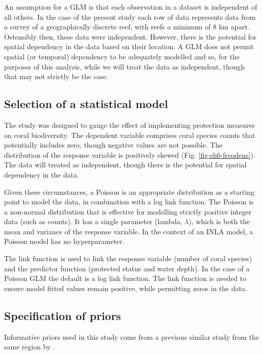 \documentclass[
]{book}
\begin{document}
An assumption for a GLM is that each observation in a dataset is independent of all others. In the case of the present study each row of data represents data from a survey of a geographically discrete reef, with reefs a minimum of 8 km apart. Ostensibly then, these data were independent. However, there is the potential for spatial dependency in the data based on their location. A GLM does not permit spatial (or temporal) dependency to be adequately modelled and so, for the purposes of this analysis, while we will treat the data as independent, though that may not strictly be the case.

\hypertarget{nb-select}{%
\subsection{Selection of a statistical model}\label{nb-select}}

The study was designed to gauge the effect of implementing protection measures on coral biodiversity. The dependent variable comprises coral species counts that potentially includes zero, though negative values are not possible. The distribution of the response variable is positively skewed (Fig. \ref{fig:ch6-freqdens}). The data will treated as independent, though there is the potential for spatial dependency in the data.

Given these circumstances, a Poisson is an appropriate distribution as a starting point to model the data, in combination with a log link function. The Poisson is a non-normal distribution that is effective for modelling strictly positive integer data (such as counts). It has a single parameter (lambda, \(\lambda\)), which is both the mean and variance of the response variable. In the context of an INLA model, a Poisson model has no hyperparameter.

The link function is used to link the response variable (number of coral species) and the predictor function (protected status and water depth). In the case of a Poisson GLM the default is a log link function. The link function is needed to ensure model fitted values remain positive, while permitting zeros in the data.

\hypertarget{nb-prior-spec}{%
\subsection{Specification of priors}\label{nb-prior-spec}}

Informative priors used in this study come from a previous similar study from the same region by \citet{Waheed_2015}.
\end{document}
